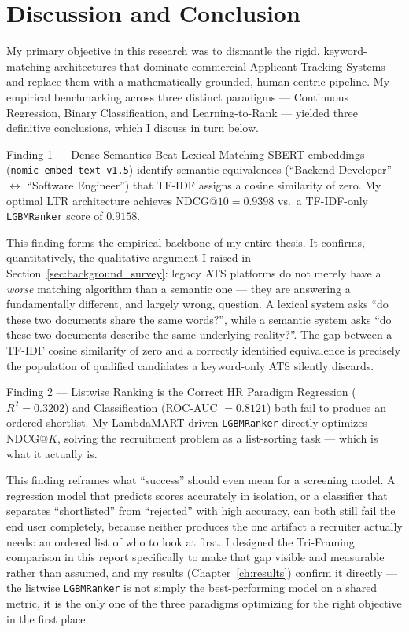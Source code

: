 \chapter{Discussion and Conclusion}
\label{ch:discussion}

My primary objective in this research was to dismantle the rigid, keyword-matching architectures that dominate commercial Applicant Tracking Systems and replace them with a mathematically grounded, human-centric pipeline. My empirical benchmarking across three distinct paradigms --- Continuous Regression, Binary Classification, and Learning-to-Rank --- yielded three definitive conclusions, which I discuss in turn below.

\begin{keyresult}{Finding 1 --- Dense Semantics Beat Lexical Matching}
SBERT embeddings (\texttt{nomic-embed-text-v1.5}) identify semantic equivalences (``Backend Developer'' $\leftrightarrow$ ``Software Engineer'') that TF-IDF assigns a cosine similarity of zero. My optimal LTR architecture achieves $\text{NDCG}@10 = 0.9398$ vs.\ a TF-IDF-only \texttt{LGBMRanker} score of $0.9158$.
\end{keyresult}

This finding forms the empirical backbone of my entire thesis. It confirms, quantitatively, the qualitative argument I raised in Section~\ref{sec:background_survey}: legacy ATS platforms do not merely have a \textit{worse} matching algorithm than a semantic one --- they are answering a fundamentally different, and largely wrong, question. A lexical system asks ``do these two documents share the same words?'', while a semantic system asks ``do these two documents describe the same underlying reality?''. The gap between a TF-IDF cosine similarity of zero and a correctly identified equivalence is precisely the population of qualified candidates a keyword-only ATS silently discards.

\begin{keyresult}{Finding 2 --- Listwise Ranking is the Correct HR Paradigm}
Regression ($R^2 = 0.3202$) and Classification (ROC-AUC $= 0.8121$) both fail to produce an ordered shortlist. My LambdaMART-driven \texttt{LGBMRanker} directly optimizes $\text{NDCG}@K$, solving the recruitment problem as a list-sorting task --- which is what it actually is.
\end{keyresult}

This finding reframes what ``success'' should even mean for a screening model. A regression model that predicts scores accurately in isolation, or a classifier that separates ``shortlisted'' from ``rejected'' with high accuracy, can both still fail the end user completely, because neither produces the one artifact a recruiter actually needs: an ordered list of who to look at first. I designed the Tri-Framing comparison in this report specifically to make that gap visible and measurable rather than assumed, and my results (Chapter~\ref{ch:results}) confirm it directly --- the listwise \texttt{LGBMRanker} is not simply the best-performing model on a shared metric, it is the only one of the three paradigms optimizing for the right objective in the first place.

